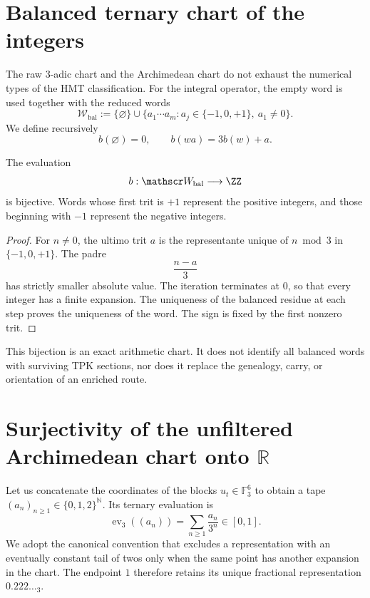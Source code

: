 \section{Balanced ternary chart of the integers}

The raw 3-adic chart and the Archimedean chart do not exhaust the numerical types
of the HMT classification. For the integral operator, the empty word is used together with the
reduced words
\[
 \mathscr W_{\mathrm{bal}}
 :=\{\varnothing\}\cup
 \{a_1\cdots a_m:
 a_j\in\{-1,0,+1\},\ a_1\ne0\}.
\]
We define recursively
\[
 b(\varnothing)=0,
 \qquad
 b(wa)=3b(w)+a.
\]

\begin{theorem}
\label{pf84:C03}
The evaluation
\[
 b:\mathscr W_{\mathrm{bal}}\longrightarrow\ZZ
\]
is bijective. Words whose first trit is \(+1\) represent the
positive integers, and those beginning with \(-1\) represent the negative integers.
\end{theorem}

\begin{proof}
For \(n\ne0\), the ultimo trit \(a\) is the representante unique of
\(n\bmod3\) in \(\{-1,0,+1\}\). The padre
\[
 \frac{n-a}{3}
\]
has strictly smaller absolute value. The iteration terminates at \(0\), so
that every integer has a finite expansion. The uniqueness of the balanced
residue at each step proves the uniqueness of the word. The sign is fixed
by the first nonzero trit.
\end{proof}

\begin{remark}
This bijection is an exact arithmetic chart. It does not identify all
balanced words with surviving TPK sections, nor does it replace the
genealogy, carry, or orientation of an enriched route.
\end{remark}

\section{Surjectivity of the unfiltered Archimedean chart onto \(\mathbb R\)}

Let us concatenate the coordinates of the blocks
\(u_t\in\mathbb F_3^6\) to obtain a tape
\((a_n)_{n\geq1}\in\{0,1,2\}^{\mathbb N}\). Its ternary evaluation is
\[
 \operatorname{ev}_3((a_n))=
 \sum_{n\geq1}\frac{a_n}{3^n}\in[0,1].
\]
We adopt the canonical convention that excludes a representation with an
eventually constant tail of twos only when the same point has another expansion
in the chart. The endpoint \(1\) therefore retains its unique fractional
representation \(0.222\ldots{}_3\).

